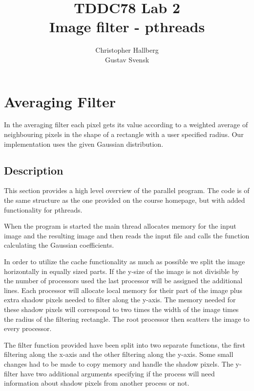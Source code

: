 \documentclass[a4paper, 12pt]{article}
\begin{document}
\title{TDDC78 Lab 2\\
        Image filter - pthreads}
\author{Christopher Hallberg \\
        Gustav Svensk}
\maketitle

\thispagestyle{empty}

\newpage
\setcounter{page}{1}
\tableofcontents
\newpage

\section{Averaging Filter}
In the averaging filter each pixel gets its value according to a weighted average
of neighbouring pixels in the shape of a rectangle with a user specified radius. 
Our implementation uses the given Gaussian distribution.

\subsection{Description}
\label{sec:desc}
This section provides a high level overview of the parallel program. 
The code is of the same structure as the one provided on the course homepage,
but with added functionality for pthreads.

When the program is started the main thread allocates memory for the input image
and the resulting image and then reads the input file and calls the function
calculating the Gaussian coefficients. 

In order to utilize the cache functionality as much as possible we split the image
horizontally in equally sized parts. If the y-size of the image is not divisible
by the number of processors used the last processor will be assigned the
additional lines. Each processor will allocate local memory for their part of the
image plus extra shadow pixels needed to filter along the y-axis. The memory
needed for these shadow pixels will correspond to two times the width of the
image times the radius of the filtering rectangle. The root processor then 
scatters the image to every processor.  

The filter function provided have been split into two separate functions, the
first filtering along the x-axis and the other filtering along the y-axis. Some
small changes had to be made to copy memory and handle the shadow pixels. The
y-filter have two additional arguments specifying if the process will need
information about shadow pixels from another process or not. 
\end{document}
